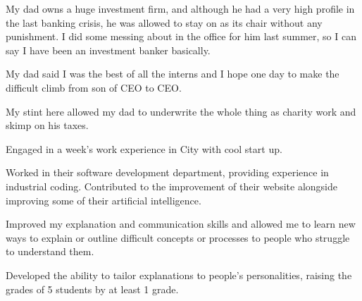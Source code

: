     \sectionspace %

        \begin{tightitemize}
            \item My dad owns a huge investment firm, and although he had a very high profile in the last banking crisis, he was allowed to stay on as its chair without any
            punishment. I did some messing about in the office for him last summer, so I can say I have been an investment banker basically.
            \item My dad said I was the best of all the interns and I hope one day to make the difficult climb from son of CEO to CEO. 
            \item My stint here allowed my dad to underwrite the whole thing as charity work and skimp on his taxes.
        \end{tightitemize}

    \sectionspace %

        \begin{tightitemize}
            \item Engaged in a week's work experience in City with cool start up.
            \item Worked in their software development department, providing experience in industrial coding. Contributed to the improvement of their website alongside improving
            some of their artificial intelligence.
        \end{tightitemize}

    \sectionspace %

        \begin{tightitemize}
            \item Improved my explanation and communication skills and allowed me to learn new ways to explain or outline difficult concepts or processes to people who struggle
            to understand them.
            \item Developed the ability to tailor explanations to people's personalities, raising the grades of 5 students by at least 1 grade.
        \end{tightitemize}

